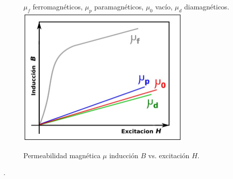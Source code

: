 \begin{figure}[h]
	\centering
	$\mu_{f}$ ferromagnéticos, $\mu_{p}$ paramagnéticos, $\mu_{0}$ vacío, $\mu_{d}$ diamagnéticos.
	\includegraphics[width=0.75\textwidth]{./Figures/permeabilidad2.jpg}
	\caption{Permeabilidad magnética $\mu$ inducción $B$ vs. excitación $H$.}
	\label{fig:Permeability}
\end{figure}.


